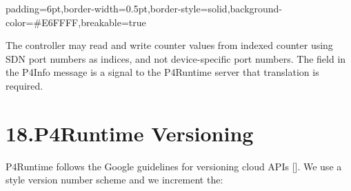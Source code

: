 \documentclass[11pt]{article}
\begin{document}
{%
\begin{mdbmargintb}{6pt}{6pt}%
\begin{mdblock}{padding=6pt,border-width=0.5pt,border-style=solid,background-color=\#E6FFFF,breakable=true}%
\begin{mdpre}%
\end{mdpre}%
\end{mdblock}%
\end{mdbmargintb}%

\noindent{}The controller may read and write counter values from indexed counter 
using SDN port numbers as indices, and not device-specific port numbers. The
 field in the P4Info message is a signal to the P4Runtime
server that translation is required.%

\section{18.\hspace*{0.5em}P4Runtime Versioning}\label{sec-p4runtime-versioning}%

\noindent{}P4Runtime follows the Google guidelines for versioning cloud APIs
[]. We use a  style version number scheme and
we increment the:%

}
\end{document}
